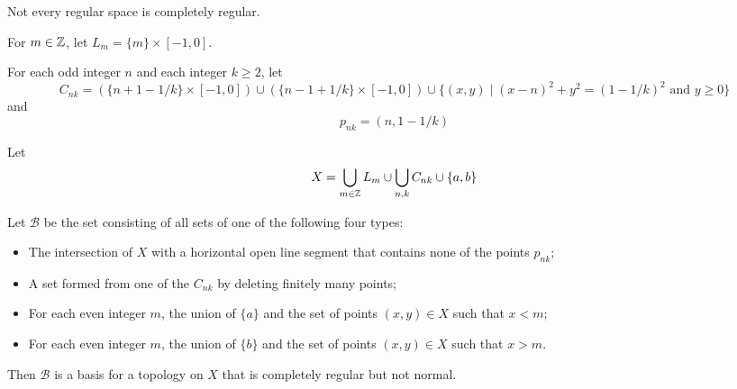\begin{example}[Choice]
    Not every regular space is completely regular.
    
    For $m \in \mathbb{Z}$, let $L_m = \{ m \} \times [-1, 0]$.

    For each odd integer $n$ and each integer $k \geq 2$, let
    \[ C_{nk} = (\{ n + 1 - 1/k \} \times [-1, 0])
    \cup (\{n - 1 + 1/k\} \times [-1, 0])
    \cup \{ (x,y) \mid (x-n)^2 + y^2 = (1 - 1/k)^2 \text{ and } y \geq 0 \} \]
    and
    \[ p_{nk} = (n, 1 - 1/k) \]

    Let
    \[ X = \bigcup_{m \in \mathbb{Z}} L_m \cup \bigcup_{n,k} C_{nk} \cup \{ a, b \} \]

    Let $\mathcal{B}$ be the set consisting of all sets of one of the following
    four types:
    \begin{itemize}
        \item The intersection of $X$ with a horizontal open line segment that contains none
        of the points $p_{nk}$;
        \item A set formed from one of the $C_{nk}$ by deleting finitely many points;
        \item For each even integer $m$, the union of $\{a\}$ and the set of points
        $(x,y) \in X$ such that $x < m$;
        \item For each even integer $m$, the union of $\{b\}$ and the set of points
        $(x,y) \in X$ such that $x > m$.
    \end{itemize}

    Then $\mathcal{B}$ is a basis for a topology on $X$ that is completely regular
    but not normal.
    

\end{example}
